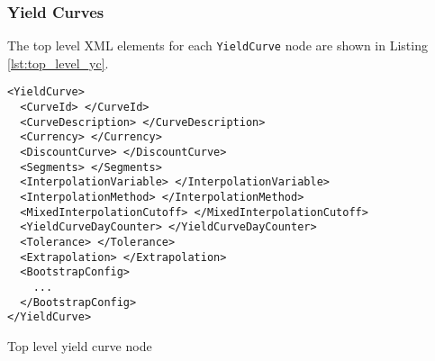 \subsubsection{Yield Curves}

The top level XML elements for each \lstinline!YieldCurve! node are shown in Listing \ref{lst:top_level_yc}.

\begin{listing}[H]
\begin{verbatim}
<YieldCurve>
  <CurveId> </CurveId>
  <CurveDescription> </CurveDescription>
  <Currency> </Currency>
  <DiscountCurve> </DiscountCurve>
  <Segments> </Segments>
  <InterpolationVariable> </InterpolationVariable>
  <InterpolationMethod> </InterpolationMethod>
  <MixedInterpolationCutoff> </MixedInterpolationCutoff>
  <YieldCurveDayCounter> </YieldCurveDayCounter>
  <Tolerance> </Tolerance>
  <Extrapolation> </Extrapolation>
  <BootstrapConfig>
    ...
  </BootstrapConfig>
</YieldCurve>
\end{verbatim}
\caption{Top level yield curve node}
\label{lst:top_level_yc}
\end{listing}

